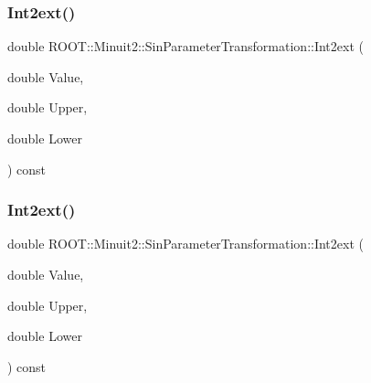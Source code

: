 \subsubsection{\texorpdfstring{Int2ext()}{Int2ext()}\hspace{0.1cm}{\footnotesize\ttfamily [1/2]}}
{\footnotesize\ttfamily double R\+O\+O\+T\+::\+Minuit2\+::\+Sin\+Parameter\+Transformation\+::\+Int2ext (\begin{DoxyParamCaption}\item[{double}]{Value,  }\item[{double}]{Upper,  }\item[{double}]{Lower }\end{DoxyParamCaption}) const}

\mbox{\label{classROOT_1_1Minuit2_1_1SinParameterTransformation_a53590482bc5734d9f079c8c5054d3de6}} 
\subsubsection{\texorpdfstring{Int2ext()}{Int2ext()}\hspace{0.1cm}{\footnotesize\ttfamily [2/2]}}
{\footnotesize\ttfamily double R\+O\+O\+T\+::\+Minuit2\+::\+Sin\+Parameter\+Transformation\+::\+Int2ext (\begin{DoxyParamCaption}\item[{double}]{Value,  }\item[{double}]{Upper,  }\item[{double}]{Lower }\end{DoxyParamCaption}) const}

